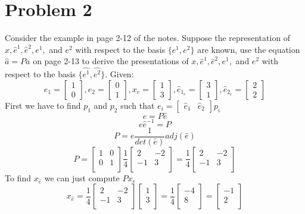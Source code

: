 \documentclass{article}
\begin{document}
\section*{Problem 2}
Consider the example in page 2-12 of the notes.
Suppose the representation of $x, \hat{e}^1, \hat{e}^2, e^1,$ and $e^2$
with respect to the basis $\{e^1,e^2\}$ are  known, use the equation $\hat{a} = Pa$ on page 2-13 to derive the presentations of
$x, \hat{e}^1, \hat{e}^2, e^1,$ and $e^2$
with respect to the basis $\{\hat{e^1},\hat{e^2}\}$.
\newline
\newline
Given:
$$
e_1 = \begin{bmatrix} 1 \\ 0 \end{bmatrix},
e_2 = \begin{bmatrix} 0 \\ 1 \end{bmatrix},
x_{e} = \begin{bmatrix} 1 \\ 3 \end{bmatrix},
\hat{e}_{1_e} = \begin{bmatrix} 3 \\ 1 \end{bmatrix},
\hat{e}_{2_e} = \begin{bmatrix} 2 \\ 2 \end{bmatrix}
$$
First we have to find $p_1$ and $p_2$ such that $e_i = \begin{bmatrix} \hat{e}_1 & \hat{e}_2\end{bmatrix} p_i$
$$ e = P\hat{e} $$
$$ e\hat{e}^{-1} = P $$
$$ P = e\frac{1}{det(\hat{e})}adj(\hat{e})$$
$$ P =
\begin{bmatrix}
1 & 0 \\
0 & 1 \\
\end{bmatrix}
\frac{1}{4}
\begin{bmatrix}
 2 & -2 \\
-1 &  3 \\
\end{bmatrix}
=
\frac{1}{4}
\begin{bmatrix}
 2 & -2 \\
-1 &  3 \\
\end{bmatrix}
$$
To find $x_{\hat{e}}$ we can just compute $Px_e$
$$ x_{\hat{e}} =
\frac{1}{4}
\begin{bmatrix}
 2 & -2 \\
-1 &  3 \\
\end{bmatrix}
\begin{bmatrix}
1 \\
3 \\
\end{bmatrix}
=
\frac{1}{4}
\begin{bmatrix}
-4 \\
8 \\
\end{bmatrix}
=
\begin{bmatrix}
-1 \\
 2 \\
\end{bmatrix}
$$
\end{document}
